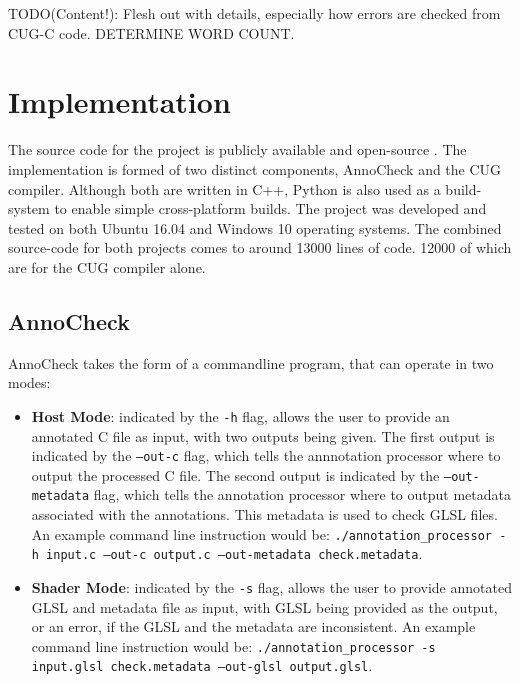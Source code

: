 \documentclass[a4paper,12pt,twoside,openright]{report}
\def\totalloccount{13000 }
\def\compilerloccount{12000 }
\begin{document}
TODO(Content!): Flesh out with details, especially how errors are checked from
CUG-C code. DETERMINE WORD COUNT.


\chapter{Implementation}


The source code for the project is publicly available and open-source
\cite{ProjectSource}. The implementation is formed of two distinct components,
AnnoCheck and the CUG compiler. Although both are written in C++, Python is
also used as a build-system to enable simple cross-platform builds. The project
was developed and tested on both Ubuntu 16.04 and Windows 10 operating systems.
The combined source-code for both projects comes to around \totalloccount lines
of code. \compilerloccount of which are for the CUG compiler alone.


\section{AnnoCheck}

\label{sec:anno_check_implemenation}

AnnoCheck takes the form of a commandline program, that can operate
in two modes:

\begin{itemize}

    \item \textbf{Host Mode}: indicated by the \texttt{-h} flag, allows the
    user to provide an annotated C file as input, with two outputs being given.
    The first output is indicated by the \texttt{--out-c} flag, which tells the
    annnotation processor where to output the processed C file. The second
    output is indicated by the \texttt{--out-metadata} flag, which tells the
    annotation processor where to output metadata associated with the
    annotations. This metadata is used to check GLSL files. An example command
    line instruction would be: \texttt{./annotation\_processor -h input.c
    --out-c output.c --out-metadata check.metadata}.

    \item \textbf{Shader Mode}: indicated by the \texttt{-s} flag, allows the
    user to provide annotated GLSL and metadata file as input, with GLSL being
    provided as the output, or an error, if the GLSL and the metadata are
    inconsistent. An example command line instruction would be:
    \texttt{./annotation\_processor -s input.glsl check.metadata --out-glsl
    output.glsl}.

\end{itemize}
\end{document}
